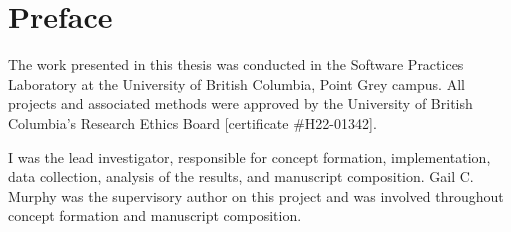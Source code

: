 
\chapter{Preface}

The work presented in this thesis was conducted in the Software Practices Laboratory at the University of British Columbia, Point Grey campus.
All projects and associated methods were approved by the University of British Columbia's Research Ethics Board [certificate \#H22-01342].

I was the lead investigator, responsible for concept formation, implementation, data collection, analysis of the results, and manuscript composition.
Gail C. Murphy was the supervisory author on this project and was involved throughout concept formation and manuscript composition.

\endinput

The Preface must include a statement indicating the student's contribution to the following:

\begin{itemize}
    \item Identification and design of the research program,
    \item Performance of the various parts of the research, and
    \item Analysis of the research data.
    \item Certain additional elements may also be required, as specified below.
\end{itemize}

